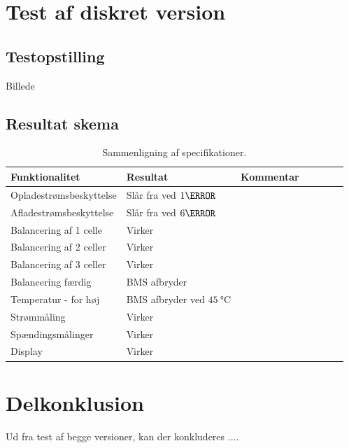 \section{Test af diskret version}\label{afs:test_diskret}


\subsection{Testopstilling}
Billede

\subsection{Resultat skema}
\begin{table}[h!]
	\small
	\centering
	\begin{threeparttable}
		\begin{tabular}{ l l l l l l l }
			\toprule
			\multicolumn{1}{l}{\textbf{Funktionalitet}}          &
			\multicolumn{1}{l}{\textbf{Resultat}}           &
			\multicolumn{1}{l}{\textbf{Kommentar}}   \\ 
			\hline
			Opladestrømsbeskyttelse        & Slår fra ved $1\ampere$   &      \\
			Afladestrømsbeskyttelse        & Slår fra ved $6\ampere$   &      \\
			Balancering af 1 celle         & Virker                    &      \\
			Balancering af 2 celler        & Virker                    &      \\
			Balancering af 3 celler        & Virker                    &      \\
			Balancering færdig             & BMS afbryder              &      \\
			Temperatur - for høj           & BMS afbryder ved   $\SI{45}{\celsius}$       &      \\
			Strømmåling                    & Virker                    &      \\
			Spændingsmålinger              & Virker                    &      \\
			Display                        & Virker                    &      \\
			
			\bottomrule
		\end{tabular}
		\caption{Sammenligning af specifikationer.}
		\label{tab:resultat_diskret}
	\end{threeparttable}
\end{table} 
\FloatBlock

\section{Delkonklusion}
Ud fra test af begge versioner, kan der konkluderes ....